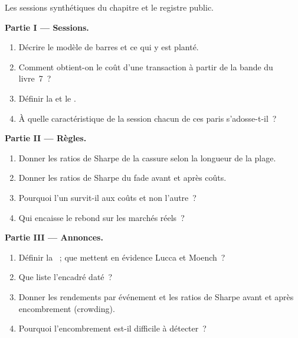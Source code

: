 \begin{problem}\label{pb:s1:short-term-futures-strategies:1}
Les sessions synthétiques du chapitre et le registre public.

\medskip\noindent\textbf{Partie I --- Sessions.}
\begin{enumerate}
\item Décrire le modèle de barres et ce qui y est planté.
\item Comment obtient-on le coût d'une transaction à partir de la bande du livre~7~?
\item Définir la  et le .
\item À quelle caractéristique de la session chacun de ces paris s'adosse-t-il~?
\end{enumerate}

\medskip\noindent\textbf{Partie II --- Règles.}
\begin{enumerate}[resume]
\item Donner les ratios de Sharpe de la cassure selon la longueur de la plage.
\item Donner les ratios de Sharpe du fade avant et après coûts.
\item Pourquoi l'un survit-il aux coûts et non l'autre~?
\item Qui encaisse le rebond sur les marchés réels~?
\end{enumerate}

\medskip\noindent\textbf{Partie III --- Annonces.}
\begin{enumerate}[resume]
\item Définir la ~; que mettent en évidence Lucca et Moench~?
\item Que liste l'encadré daté~?
\item Donner les rendements par événement et les ratios de Sharpe avant et après encombrement (crowding).
\item Pourquoi l'encombrement est-il difficile à détecter~?
\end{enumerate}


\end{problem}
